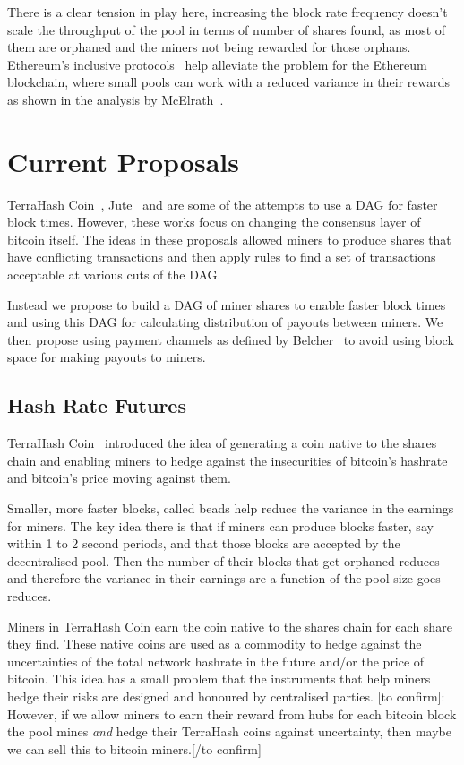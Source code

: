 \documentclass{article}
\begin{document}
There is a clear tension in play here, increasing the block rate
frequency doesn't scale the throughput of the pool in terms of number
of shares found, as most of them are orphaned and the miners not being
rewarded for those orphans. Ethereum's inclusive
protocols~\cite{inclusive-protocols} help alleviate the problem for
the Ethereum blockchain, where small pools can work with a reduced
variance in their rewards as shown in the analysis by
McElrath~\cite{mcelrath:variance}.


\section{Current Proposals}

TerraHash Coin~\cite{mcelrath:variance}, Jute~\cite{jute} and
\cite{spectre} are some of the attempts to use a DAG for faster block
times. However, these works focus on changing the consensus layer of
bitcoin itself. The ideas in these proposals allowed miners to produce
shares that have conflicting transactions and then apply rules to find
a set of transactions acceptable at various cuts of the DAG.\

Instead we propose to build a DAG of miner shares to enable faster
block times and using this DAG for calculating distribution of payouts
between miners. We then propose using payment channels as defined by
Belcher~\cite{channels-for-rewards} to avoid using block space for
making payouts to miners.

\subsection{Hash Rate Futures}

TerraHash Coin~\cite{mcelrath:variance} introduced the idea of
generating a coin native to the shares chain and enabling miners to
hedge against the insecurities of bitcoin's hashrate and bitcoin's
price moving against them.

Smaller, more faster blocks, called beads help reduce the variance in
the earnings for miners. The key idea there is that if miners can
produce blocks faster, say within 1 to 2 second periods, and that
those blocks are accepted by the decentralised pool. Then the number
of their blocks that get orphaned reduces and therefore the variance
in their earnings are a function of the pool size goes reduces.

Miners in TerraHash Coin earn the coin native to the shares chain for
each share they find. These native coins are used as a commodity to
hedge against the uncertainties of the total network hashrate in the
future and/or the price of bitcoin. This idea has a small problem that
the instruments that help miners hedge their risks are designed and
honoured by centralised parties. [to confirm]: However, if we allow
miners to earn their reward from hubs for each bitcoin block the pool
mines \emph{and} hedge their TerraHash coins against uncertainty, then
maybe we can sell this to bitcoin miners.[/to confirm]
\end{document}
